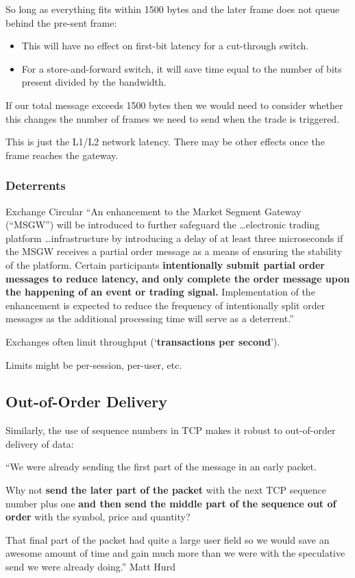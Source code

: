 \documentclass{article}
\begin{document}
So long as everything fits within 1500 bytes and the later frame does not queue behind the pre-sent frame:
\begin{itemize}
	\item This will have no effect on first-bit latency for a cut-through switch.
	\item For a store-and-forward switch, it will save time equal to the number of bits present divided by the bandwidth.
\end{itemize}

If our total message exceeds 1500 bytes then we would need to consider whether this changes the number of frames we need to send when the trade is triggered.

This is just the L1/L2 network latency. There may be other effects once the frame reaches the gateway.

\subsubsection{Deterrents}
\begin{block}{Exchange Circular}
	``An enhancement to the Market Segment Gateway (“MSGW”) will be introduced to further safeguard the \ldots electronic trading platform \ldots infrastructure by introducing a delay of at least three microseconds if the MSGW receives a partial order message as a means of ensuring the stability of the platform. Certain participants \textbf{intentionally submit partial order messages to reduce latency, and only complete the order message upon the happening of an event or trading signal.} Implementation of the enhancement is expected to reduce the frequency of intentionally split order messages as the additional processing time will serve as a deterrent.''
\end{block}

Exchanges often limit throughput (`\textbf{transactions per second}').

Limits might be per-session, per-user, etc.

\subsection{Out-of-Order Delivery}
Similarly, the use of sequence numbers in TCP makes it robust to out-of-order delivery of data:
\begin{block}{}
	``We were already sending the first part of the message in an early packet.

	Why not \textbf{send the later part of the packet} with the next TCP sequence number plus one \textbf{and then send the middle part of the sequence out of order} with the symbol, price and quantity?

	That final part of the packet had quite a large user field so we would save an awesome amount of time and gain much more than we were with the speculative send we were already doing.'' Matt Hurd
\end{block}
\end{document}
